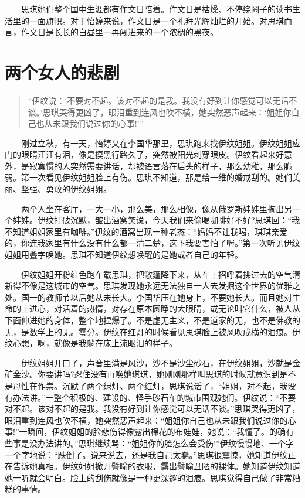 \documentclass[12pt,UTF8]{ctexbook}
\begin{document}
　　思琪她们整个国中生涯都有作文日陪着。作文日是枯燥、不停绕圈子的读书生活里的一面旗帜。对于怡婷来说，作文日是一个礼拜光辉灿烂的开始。对思琪而言，作文日是长长的白昼里一再闯进来的一个浓稠的黑夜。

\hypertarget{ux4e24ux4e2aux5973ux4ebaux7684ux60b2ux5267}{%
\section*{两个女人的悲剧}\label{ux4e24ux4e2aux5973ux4ebaux7684ux60b2ux5267}}

\begin{quote}
\enquote{伊纹说：\enquote{不要对不起。该对不起的是我。我没有好到让你感觉可以无话不谈。}思琪哭得更凶了，眼泪重到连风也吹不横，她突然恶声起来：\enquote{姐姐你自己也从未跟我们说过你的心事!}}
\end{quote}

　　刚过立秋，有一天，怡婷又在李国华那里，思琪跑来找伊纹姐姐。伊纹姐姐应门的眼睛汪汪有泪，像是摸黑行路久了，突然被阳光刺穿眼皮。伊纹看起来好意外，是寂寞惯的人突然需要讲话，却被语言落在后头的样子，那么幼稚，那么脆弱。第一次看见伊纹姐姐脸上有伤。思琪不知道，那是给一维的婚戒刮的。她们美丽、坚强、勇敢的伊纹姐姐。

　　两个人坐在客厅，一大一小，那么美，那么相像，像从俄罗斯娃娃里掏出另一个娃娃。伊纹打破沉默，皱出酒窝笑说，今天我们来偷喝咖啡好不好?思琪回：\enquote{我不知道姐姐家里有咖啡。}伊纹的酒窝出现一种老态：\enquote{妈妈不让我喝，琪琪亲爱的，你连我家里有什么没有什么都一清二楚，这下我要害怕了喔。}第一次听见伊纹姐姐用叠字唤她。思琪不知道伊纹想唤醒的是她或者自己的年轻。

　　伊纹姐姐开粉红色跑车载思琪，把敞篷降下来，从车上招呼着拂过去的空气清新得不像是这城市的空气。思琪发现她永远无法独自一人去发掘这个世界的优雅之处。国一的教师节以后她从未长大。李国华压在她身上，不要她长大。而且她对生命的上进心，对活着的热情，对存在原本圆睁的大眼睛，或无论叫它什么，被人从下面伸进她的身体，整个地捏爆了。不是虚无主义，不是道家的无，也不是佛教的无，是数学上的无。零分。伊纹在红灯的时候看见思琪脸上被风吹成横的泪痕。伊纹心想，啊，就像是我躺在床上流眼泪的样子。

　　伊纹姐姐开口了，声音里满是风沙，沙不是沙尘砂石，在伊纹姐姐，沙就是金矿金沙。你要讲吗?忍住没有再唤她琪琪，她刚刚那样叫思琪的时候就意识到是不是母性在作祟。沉默了两个绿灯、两个红灯，思琪说话了，\enquote{姐姐，对不起，我没有办法讲。}一整个积极的、建设的、怪手砂石车的城市围观她们。伊纹说：\enquote{不要对不起。该对不起的是我。我没有好到让你感觉可以无话不谈。}思琪哭得更凶了，眼泪重到连风也吹不横，她突然恶声起来：\enquote{姐姐你自己也从未跟我们说过你的心事!}一瞬间，伊纹姐姐的脸悲伤得像露出棉花的布娃娃，她说：\enquote{我懂了。的确有些事是没办法讲的。}思琪继续骂：\enquote{姐姐你的脸怎么会受伤!}伊纹慢慢地、一个字一个字地说：\enquote{跌倒了。说来说去，还是我自己太蠢。}思琪很震惊，她知道伊纹正在告诉她真相。伊纹姐姐掀开譬喻的衣服，露出譬喻丑陋的裸体。她知道伊纹知道她一听就会明白。脸上的刮伤就像是一种更深邃的泪痕。思琪觉得自己做了非常糟糕的事情。
\end{document}

